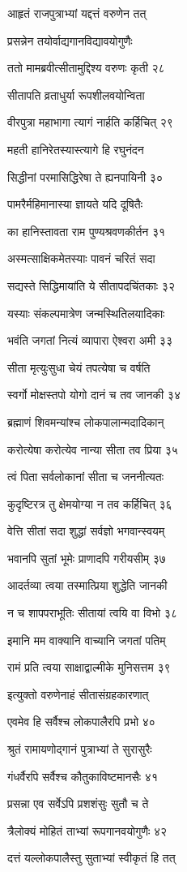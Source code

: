 आहृतं राजपुत्राभ्यां यद्दत्तं वरुणेन तत्

प्रसन्नेन तयोर्वाद्यगानविद्यावयोगुणैः

ततो मामब्रवीत्सीतामुद्दिश्य वरुणः कृती २८

सीतापति व्रताधुर्या रूपशीलवयोन्विता

वीरपुत्रा महाभागा त्यागं नार्हति कर्हिचित् २९

महती हानिरेतस्यास्त्यागे हि रघुनंदन

सिद्धीनां परमासिद्धिरेषा ते ह्यनपायिनी ३०

पामरैर्महिमानास्या ज्ञायते यदि दूषितैः

का हानिस्तावता राम पुण्यश्रवणकीर्तन ३१

अस्मत्साक्षिकमेतस्याः पावनं चरितं सदा

सद्यस्ते सिद्धिमायांति ये सीतापदचिंतकाः ३२

यस्याः संकल्पमात्रेण जन्मस्थितिलयादिकाः

भवंति जगतां नित्यं व्यापारा ऐश्वरा अमी ३३

सीता मृत्युःसुधा चेयं तपत्येषा च वर्षति

स्वर्गो मोक्षस्तपो योगो दानं च तव जानकी ३४

ब्रह्माणं शिवमन्यांश्च लोकपालान्मदादिकान्

करोत्येषा करोत्येव नान्या सीता तव प्रिया ३५

त्वं पिता सर्वलोकानां सीता च जननीत्यतः

कुदृष्टिरत्र तु क्षेमयोग्या न तव कर्हिचित् ३६

वेत्ति सीतां सदा शुद्धां सर्वज्ञो भगवान्स्वयम्

भवानपि सुतां भूमेः प्राणादपि गरीयसीम् ३७

आदर्तव्या त्वया तस्मात्प्रिया शुद्धेति जानकी

न च शापपराभूतिः सीतायां त्वयि वा विभो ३८

इमानि मम वाक्यानि वाच्यानि जगतां पतिम्

रामं प्रति त्वया साक्षाद्वाल्मीके मुनिसत्तम ३९

इत्युक्तो वरुणेनाहं सीतासंग्रहकारणात्

एवमेव हि सर्वैश्च लोकपालैरपि प्रभो ४०

श्रुतं रामायणोद्गानं पुत्राभ्यां ते सुरासुरैः

गंधर्वैरपि सर्वैश्च कौतुकाविष्टमानसैः ४१

प्रसन्ना एव सर्वेऽपि प्रशशंसुः सुतौ च ते

त्रैलोक्यं मोहितं ताभ्यां रूपगानवयोगुणैः ४२

दत्तं यल्लोकपालैस्तु सुताभ्यां स्वीकृतं हि तत्

